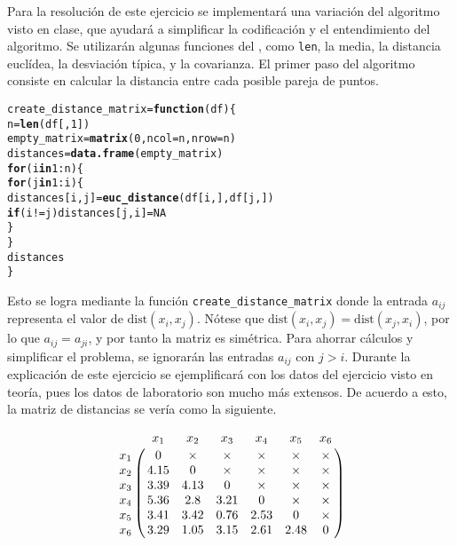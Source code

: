 \documentclass[12pt]{report}\usepackage[]{graphicx}\usepackage[dvipsnames]{xcolor}
\makeatletter
\newcommand{\hlnum}[1]{\textcolor[rgb]{0.686,0.059,0.569}{#1}}%
\newcommand{\hlopt}[1]{\textcolor[rgb]{0,0,0}{#1}}%
\newcommand{\hlstd}[1]{\textcolor[rgb]{0.345,0.345,0.345}{#1}}%
\newcommand{\hlkwa}[1]{\textcolor[rgb]{0.161,0.373,0.58}{\textbf{#1}}}%
\newcommand{\hlkwb}[1]{\textcolor[rgb]{0.69,0.353,0.396}{#1}}%
\newcommand{\hlkwc}[1]{\textcolor[rgb]{0.333,0.667,0.333}{#1}}%
\newcommand{\hlkwd}[1]{\textcolor[rgb]{0.737,0.353,0.396}{\textbf{#1}}}%
\newenvironment{kframe}{%
 \def\at@end@of@kframe{}%
 \ifinner\ifhmode%
  \def\at@end@of@kframe{\end{minipage}}%
  \begin{minipage}{\columnwidth}%
 \fi\fi%
 \def\FrameCommand##1{\hskip\@totalleftmargin \hskip-\fboxsep
 \colorbox{shadecolor}{##1}\hskip-\fboxsep
     \hskip-\linewidth \hskip-\@totalleftmargin \hskip\columnwidth}%
 \MakeFramed {\advance\hsize-\width
   \@totalleftmargin\z@ \linewidth\hsize
   \@setminipage}}%
 {\par\unskip\endMakeFramed%
 \at@end@of@kframe}
\newenvironment{knitrout}{}{} %
\newcommand{\dt}{\text{dist}}
\makeatother
\begin{document}
		 		Para la resolución de este ejercicio se implementará una variación del algoritmo visto en clase, que ayudará a simplificar la codificación y el entendimiento del algoritmo. Se utilizarán algunas funciones del , como \texttt{len}, la media, la distancia euclídea, la desviación típica, y la covarianza. El primer paso del algoritmo consiste en calcular la distancia entre cada posible pareja de puntos. 
		 		
\begin{knitrout}
\color{fgcolor}\begin{kframe}
\begin{alltt}
\hlstd{create_distance_matrix} \hlkwb{=} \hlkwa{function}\hlstd{(}\hlkwc{df}\hlstd{) \{}
        \hlstd{n} \hlkwb{=} \hlkwd{len}\hlstd{(df[,}\hlnum{1}\hlstd{])}
        \hlstd{empty_matrix} \hlkwb{=} \hlkwd{matrix}\hlstd{(}\hlnum{0}\hlstd{,} \hlkwc{ncol} \hlstd{= n,} \hlkwc{nrow} \hlstd{= n)}
        \hlstd{distances} \hlkwb{=} \hlkwd{data.frame}\hlstd{(empty_matrix)}
        \hlkwa{for} \hlstd{(i} \hlkwa{in} \hlnum{1}\hlopt{:}\hlstd{n) \{}
                \hlkwa{for} \hlstd{(j} \hlkwa{in} \hlnum{1}\hlopt{:}\hlstd{i) \{}
                        \hlstd{distances[i, j]} \hlkwb{=} \hlkwd{euc_distance}\hlstd{(df[i,], df[j,])}
                        \hlkwa{if} \hlstd{(i} \hlopt{!=} \hlstd{j) distances[j, i]} \hlkwb{=} \hlnum{NA}
                \hlstd{\}}
        \hlstd{\}}
        \hlstd{distances}
\hlstd{\}}
\end{alltt}
\end{kframe}
\end{knitrout}
		 		
		 		Esto se logra mediante la función \texttt{create\_distance\_matrix} donde la entrada $a_{ij}$ representa el valor de $\dt(x_i, x_j)$. Nótese que $\dt(x_i, x_j) = \dt(x_j, x_i)$, por lo que $a_{ij} = a_{ji}$, y por tanto la matriz es simétrica. Para ahorrar cálculos y simplificar el problema, se ignorarán las entradas $a_{ij}$ con $j > i$. Durante la explicación de este ejercicio se ejemplificará con los datos del ejercicio visto en teoría, pues los datos de laboratorio son mucho más extensos. De acuerdo a esto, la matriz de distancias se vería como la siguiente. 
		 		
		 		$$
		 		\bordermatrix{
		 			& x_1 & x_2 & x_3 & x_4 & x_5 & x_6 \cr
		 			x_1 & 0 & \times & \times & \times & \times & \times\cr
		 			x_2 & 4.15 & 0 & \times & \times & \times & \times\cr
		 			x_3 & 3.39 & 4.13 & 0 & \times & \times & \times\cr
		 			x_4 & 5.36 & 2.8 & 3.21 & 0 & \times & \times\cr
		 			x_5 & 3.41 & 3.42 & 0.76 & 2.53 & 0 & \times\cr
		 			x_6 & 3.29 & 1.05 & 3.15 & 2.61 & 2.48 & 0
		 		}
		 		$$
		 		
\end{document}
